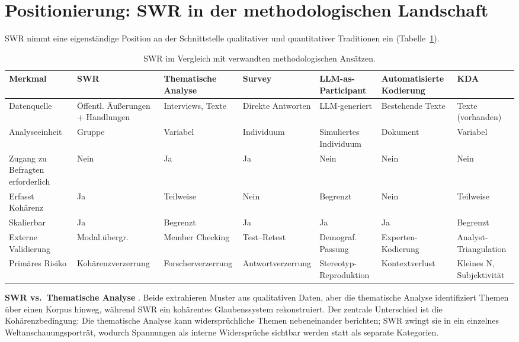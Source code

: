 \documentclass[11pt,a4paper]{article}
\begin{document}
\section{Positionierung: SWR in der methodologischen Landschaft}
\label{sec:positioning}

SWR nimmt eine eigenst\"andige Position an der Schnittstelle qualitativer und quantitativer Traditionen ein (Tabelle~\ref{tab:comparison}).

\begin{table}[htbp]
  \centering
  \caption{SWR im Vergleich mit verwandten methodologischen Ans\"atzen.}
  \label{tab:comparison}
  \scriptsize
  \begin{tabular}{@{} p{2.2cm} p{1.7cm} p{1.7cm} p{1.7cm} p{1.7cm} p{1.7cm} p{1.7cm} @{}}
    \toprule
    \textbf{Merkmal} & \textbf{SWR} & \textbf{Thematische Analyse} & \textbf{Survey} & \textbf{LLM-as-Participant} & \textbf{Automatisierte Kodierung} & \textbf{KDA} \\
    \midrule
    Datenquelle & \"Offentl. \"Au\ss{}erungen + Handlungen & Interviews, Texte & Direkte Antworten & LLM-generiert & Bestehende Texte & Texte (vorhanden) \\[3pt]
    Analyseeinheit & Gruppe & Variabel & Individuum & Simuliertes Individuum & Dokument & Variabel \\[3pt]
    Zugang zu Befragten erforderlich & Nein & Ja & Ja & Nein & Nein & Nein \\[3pt]
    Erfasst Koh\"arenz & Ja & Teilweise & Nein & Begrenzt & Nein & Teilweise \\[3pt]
    Skalierbar & Ja & Begrenzt & Ja & Ja & Ja & Begrenzt \\[3pt]
    Externe Validierung & Modal.\"ubergr. & Member Checking & Test--Retest & Demograf. Passung & Experten-Kodierung & Analyst-Triangulation \\[3pt]
    Prim\"ares Risiko & Koh\"arenzverzerrung & Forscherverzerrung & Antwortverzerrung & Stereotyp-Reproduktion & Kontextverlust & Kleines N, Subjektivit\"at \\
    \bottomrule
  \end{tabular}
\end{table}

\textbf{SWR vs.\ Thematische Analyse} \citep{Braun2006}. Beide extrahieren Muster aus qualitativen Daten, aber die thematische Analyse identifiziert Themen \"uber einen Korpus hinweg, w\"ahrend SWR ein koh\"arentes Glaubenssystem rekonstruiert. Der zentrale Unterschied ist die Koh\"arenzbedingung: Die thematische Analyse kann widerspr\"uchliche Themen nebeneinander berichten; SWR zwingt sie in ein einzelnes Weltanschauungsportr\"at, wodurch Spannungen als interne Widerspr\"uche sichtbar werden statt als separate Kategorien.
\end{document}
